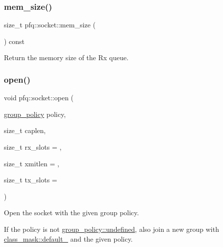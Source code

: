 \subsubsection{\texorpdfstring{mem\+\_\+size()}{mem\_size()}}
{\footnotesize\ttfamily size\+\_\+t pfq\+::socket\+::mem\+\_\+size (\begin{DoxyParamCaption}{ }\end{DoxyParamCaption}) const\hspace{0.3cm}{\ttfamily [inline]}}



Return the memory size of the Rx queue. 

\mbox{\label{classpfq_1_1socket_ae9ed7e81f5aaa789417fe4eff43a1f5a}} 
\subsubsection{\texorpdfstring{open()}{open()}\hspace{0.1cm}{\footnotesize\ttfamily [1/3]}}
{\footnotesize\ttfamily void pfq\+::socket\+::open (\begin{DoxyParamCaption}\item[{\hyperlink{namespacepfq_ac41249c8510558905b01fa4d866a38d7}{group\+\_\+policy}}]{policy,  }\item[{size\+\_\+t}]{caplen,  }\item[{size\+\_\+t}]{rx\+\_\+slots = {},  }\item[{size\+\_\+t}]{xmitlen = {},  }\item[{size\+\_\+t}]{tx\+\_\+slots = {} }\end{DoxyParamCaption})\hspace{0.3cm}{\ttfamily [inline]}}



Open the socket with the given group policy. 

If the policy is not \hyperlink{namespacepfq_ac41249c8510558905b01fa4d866a38d7a5e543256c480ac577d30f76f9120eb74}{group\+\_\+policy\+::undefined}, also join a new group with \hyperlink{namespacepfq_a96af1f5ed530eff563eb917516758fbba172b03053216c6158fe380805998ad6c}{class\+\_\+mask\+::default\+\_\+} and the given policy. \mbox{\label{classpfq_1_1socket_a192d3e67f6943f71ed3d7e4012eb29ee}} 
